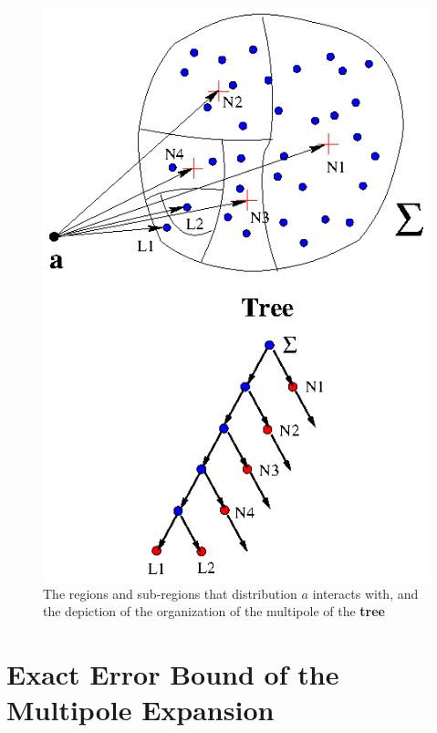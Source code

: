 \documentclass[prb,aps,nobibnotes,twocolumn,doublespace,twocolumngrid,superbib]{revtex4}
\begin{document}
%
%
\begin{figure}
\caption{The regions and sub-regions that distribution $a$ interacts with, and the depiction of the
organization of the multipole of the {\bf tree}}
{\centering \includegraphics {TreeInBox.ps} \par} 
\label{figure:TreeInBox} 
\end{figure}

\section{Exact Error Bound of the Multipole Expansion} 
\end{document}
